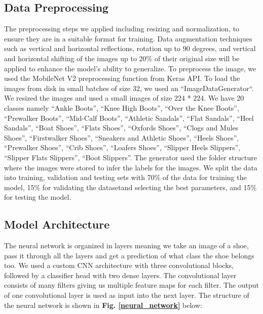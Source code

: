 \documentclass[11pt,a4paper]{article}
\begin{document}
\subsection{Data Preprocessing}
The preprocessing steps we applied including resizing and normalization, to ensure they are in a suitable format for training. Data augmentation techniques such as vertical and horizontal reflections, rotation up to 90 degrees, and vertical and horizontal shifting of the images up to 20\% of their original size will be applied to enhance the model's ability to generalize.  To preprocess the image, we used the MobileNet V2 preprocessing function from Keras API.  To load the images from disk in small batches of size 32, we used an ``ImageDataGenerator``.  We resized the images and used a small images of size 224 * 224. We have 20 classes namely ``Ankle Boots'', ``Knee High Boots'', ``Over the Knee Boots'', ``Prewalker Boots'', ``Mid-Calf Boots'', ``Athletic Sandals'', ``Flat Sandals'', ``Heel Sandals'', ``Boat Shoes'', ``Flats Shoes'', ``Oxfords Shoes'', ``Clogs and Mules Shoes'',  ``Firstwalker Shoes'', ``Sneakers and Athletic Shoes'', ``Heels Shoes'', ``Prewalker Shoes'', ``Crib Shoes'', ``Loafers Shoes'', ``Slipper Heels Slippers'', ``Slipper Flats Slippers'', ``Boot Slippers''. The generator used the folder structure where the images were stored to infer the labels for the images. We split the data into training, validation and testing sets with 70\% of the data for training the model, 15\% for validating the datasetand selecting the best parameters, and 15\% for testing the model. 

\subsection{Model Architecture}
The neural network is organized in layers meaning we take an image of a shoe, pass it through all the layers and get a prediction of what class the shoe belongs too. We used a custom CNN architecture with three convolutional blocks, followed by a classifier head with two dense layers. The convolutional layer consists of many filters giving us multiple feature maps for each filter.  The output of one convolutional layer is used as input into the next layer. The structure of the neural network is shown in \textbf{Fig. \ref{neural_network}} below:
\end{document}
